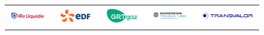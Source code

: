 \documentclass[9pt]{beamer}
\begin{document}
\begin{frame}{}
    \vspace{0.3cm}

    \noindent\makebox[\linewidth]{\rule{1.0\textwidth}{0.4pt}}

    \begin{figure}
        \begin{tabular}{c}
            \includegraphics[width=1.0\textwidth]{TEMPLATE_IMAGES/logos_MESSIAH.pdf} \\
        \end{tabular}
    \end{figure}

\end{frame}
\end{document}
